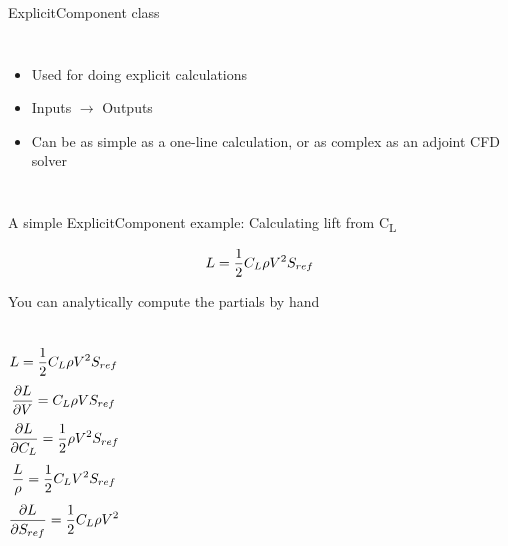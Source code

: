 \documentclass[aspectratio=169, usenames, dvipsnames, 14pt]{beamer}
\begin{document}
\begin{frame}{ExplicitComponent class}
    \begin{columns}[T]
  
            \begin{itemize}
                \item Used for doing explicit calculations
                \vspace{.5cm}
                \item Inputs $\rightarrow$ Outputs
                \vspace{.5cm}
                \item Can be as simple as a one-line calculation, or as complex as an adjoint CFD solver
            \end{itemize}

  \end{columns}
 
\end{frame}

\begin{frame}{A simple ExplicitComponent example: Calculating lift from C\textsubscript{L}}

	\begin{equation}
		\large L = \frac{1}{2} C_L \rho V^2 S_{ref}
	\end{equation}
	
\end{frame}

\begin{frame}{You can analytically compute the partials by hand}

	\begin{columns}
			\begin{equation}
				\large L = \frac{1}{2} C_L \rho V^2 S_{ref}
			\end{equation}
			\begin{equation}
				\small \frac{\partial L}{\partial V} = C_L \rho V S_{ref} 
			\end{equation}
			\begin{equation}
				\small \frac{\partial L}{\partial C_L} = \frac{1}{2} \rho V^2 S_{ref}
			\end{equation}
			\begin{equation}
				\small \frac{L}{\rho} = \frac{1}{2} C_L V^2 S_{ref}
			\end{equation}
			\begin{equation}
				\small \frac{\partial L}{\partial S_{ref}} = \frac{1}{2} C_L \rho V^2
			\end{equation}
	\end{columns}

\end{frame}
\end{document}
